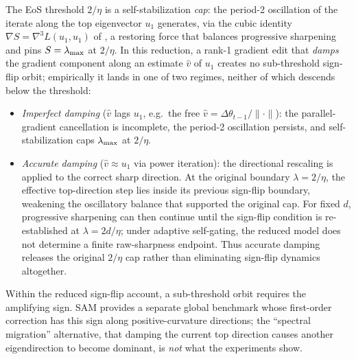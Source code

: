 \begin{claim}
\label{clm:rank1}
The EoS threshold $2/\eta$ is a self-stabilization \emph{cap}: the period-2
oscillation of the iterate along the top eigenvector $u_{1}$ generates, via the
cubic identity $\nabla S=\nabla^{3}L(u_{1},u_{1})$ of
\citet{damian2023selfstab}, a restoring force that balances progressive
sharpening and pins $S=\lambda_{\max}$ at $2/\eta$. In this reduction, a rank-1 gradient edit that \emph{damps}
the gradient component along an estimate $\hat v$ of $u_{1}$ creates no
sub-threshold sign-flip orbit; empirically it lands in one of two
regimes, neither of which descends below the threshold:
\begin{itemize}
  \item \emph{Imperfect damping} ($\hat v$ lags $u_{1}$, e.g.\ the free
        $\hat v=\Delta\theta_{t-1}/\|\cdot\|$): the parallel-gradient
        cancellation is incomplete, the period-2 oscillation persists, and
        self-stabilization caps $\lambda_{\max}$ at $2/\eta$.
  \item \emph{Accurate damping} ($\hat v\approx u_{1}$ via power iteration):
        the directional rescaling is applied to the correct sharp direction.
        At the original boundary $\lambda=2/\eta$, the effective top-direction
        step lies inside its previous sign-flip boundary, weakening the
        oscillatory balance that supported the original cap. For fixed $d$,
        progressive sharpening can then continue until the sign-flip condition
        is re-established at $\lambda=2d/\eta$; under adaptive self-gating,
        the reduced model does not determine a finite raw-sharpness endpoint.
        Thus accurate damping releases the original $2/\eta$ cap rather than
        eliminating sign-flip dynamics altogether.
\end{itemize}
Within the reduced sign-flip account, a sub-threshold orbit requires the
amplifying sign. SAM provides a separate global benchmark whose first-order
correction has this sign along positive-curvature directions; the
``spectral migration'' alternative, that damping the current top direction
causes another eigendirection to become dominant, is \emph{not} what
the experiments show.
\end{claim}

